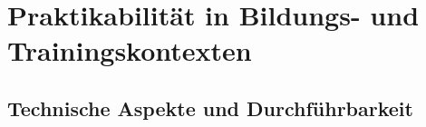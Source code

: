 \chapter{Praktikabilität in Bildungs- und Trainingskontexten}
\label{chap:praktikabilität}


\section{Technische Aspekte und Durchführbarkeit}
\label{sec:tech_durchführbarkeit}


\label{subsec:kosten}


\label{subsubsec:gerätekosten}

\label{subsubsec:kostenvergleich}

